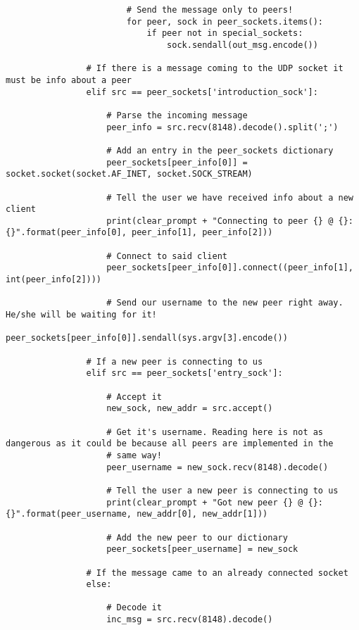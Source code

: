 \documentclass[landscape]{article}
\begin{document}
\begin{verbatim}
                        # Send the message only to peers!
                        for peer, sock in peer_sockets.items():
                            if peer not in special_sockets:
                                sock.sendall(out_msg.encode())

                # If there is a message coming to the UDP socket it must be info about a peer
                elif src == peer_sockets['introduction_sock']:

                    # Parse the incoming message
                    peer_info = src.recv(8148).decode().split(';')

                    # Add an entry in the peer_sockets dictionary
                    peer_sockets[peer_info[0]] = socket.socket(socket.AF_INET, socket.SOCK_STREAM)

                    # Tell the user we have received info about a new client
                    print(clear_prompt + "Connecting to peer {} @ {}:{}".format(peer_info[0], peer_info[1], peer_info[2]))

                    # Connect to said client
                    peer_sockets[peer_info[0]].connect((peer_info[1], int(peer_info[2])))

                    # Send our username to the new peer right away. He/she will be waiting for it!
                    peer_sockets[peer_info[0]].sendall(sys.argv[3].encode())

                # If a new peer is connecting to us
                elif src == peer_sockets['entry_sock']:

                    # Accept it
                    new_sock, new_addr = src.accept()

                    # Get it's username. Reading here is not as dangerous as it could be because all peers are implemented in the
                    # same way!
                    peer_username = new_sock.recv(8148).decode()

                    # Tell the user a new peer is connecting to us
                    print(clear_prompt + "Got new peer {} @ {}:{}".format(peer_username, new_addr[0], new_addr[1]))

                    # Add the new peer to our dictionary
                    peer_sockets[peer_username] = new_sock

                # If the message came to an already connected socket
                else:

                    # Decode it
                    inc_msg = src.recv(8148).decode()


\end{verbatim}
\end{document}
